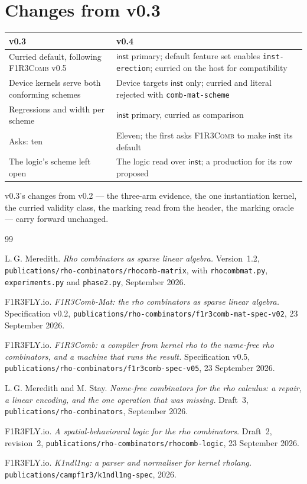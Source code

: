 \documentclass[11pt,a4paper]{article}
\newcommand{\code}[1]{\texttt{#1}}
\newcommand{\Comb}{\textsc{F1R3Comb}}
\theoremstyle{definition}
\theoremstyle{plain}
\newcommand{\inst}{\mathsf{inst}}
\begin{document}
\section{Changes from v0.3}\label{sec:v3delta}

\begin{center}
\begin{tabularx}{\linewidth}{@{}l>{\raggedright\arraybackslash}X@{}}
\toprule
v0.3 & v0.4\\
\midrule
Curried default, following \Comb{} v0.5 & $\inst$ primary; default feature
set enables \code{inst-erection}; curried on the host for compatibility\\
Device kernels serve both conforming schemes & Device targets $\inst$ only;
curried and literal rejected with \code{comb-mat-scheme}\\
Regressions and width per scheme & $\inst$ primary, curried as comparison\\
Asks: ten & Eleven; the first asks \Comb{} to make $\inst$ its default\\
The logic's scheme left open & The logic read over $\inst$; a production for
its row proposed\\
\bottomrule
\end{tabularx}
\end{center}

\noindent
v0.3's changes from v0.2 --- the three-arm evidence, the one instantiation
kernel, the curried validity class, the marking read from the header, the
marking oracle --- carry forward unchanged.

\begin{thebibliography}{99}

 L.\,G. Meredith.
\emph{Rho combinators as sparse linear algebra.} Version~1.2,
\code{publications/rho-combinators/rhocomb-matrix}, with \code{rhocombmat.py},
\code{experiments.py} and \code{phase2.py}, September 2026.

 F1R3FLY.io.
\emph{F1R3Comb-Mat: the rho combinators as sparse linear algebra.}
Specification v0.2, \code{publications/rho-combinators/f1r3comb-mat-spec-v02},
23 September 2026.

 F1R3FLY.io.
\emph{F1R3Comb: a compiler from kernel rho to the name-free rho combinators,
and a machine that runs the result.} Specification v0.5,
\code{publications/rho-combinators/f1r3comb-spec-v05}, 23 September 2026.

 L.\,G. Meredith and M. Stay.
\emph{Name-free combinators for the rho calculus: a repair, a linear encoding,
and the one operation that was missing.} Draft~3,
\code{publications/rho-combinators}, September 2026.

 F1R3FLY.io.
\emph{A spatial-behavioural logic for the rho combinators.} Draft~2,
revision~2, \code{publications/rho-combinators/rhocomb-logic}, 23 September
2026.

 F1R3FLY.io.
\emph{K1ndl1ng: a parser and normaliser for kernel rholang.}
\code{publications/campf1r3/k1ndl1ng-spec}, 2026.

\end{thebibliography}
\end{document}
